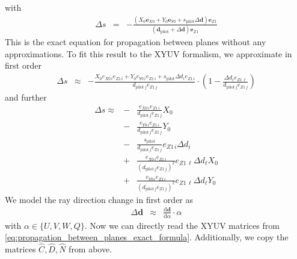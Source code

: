 \documentclass[12pt,a4paper,twoside,openright,BCOR10mm,headsepline,titlepage,abstracton,chapterprefix,final]{scrreprt}
\newcommand\Vector[1]{{\mathbf{#1}}}
\newcommand\totald{\textrm{d}}
\begin{document}
with
\begin{eqnarray}
  \Delta s &=& -\frac{ \left( X_0 \Vector{e}_{X0} + Y_0 \Vector{e}_{Y0} + s_{\text{pilot}} \Delta \Vector{d} \right) \Vector{e}_{Z1}}
                     { \left( \Vector{d}_{\text{pilot}} + \Delta \Vector{d} \right)\Vector{e}_{Z1}  }
\end{eqnarray}
This is the exact equation for propagation between planes without any approximations.
To fit this result to the XYUV formalism, we approximate in first order
\begin{eqnarray}
  \Delta s &\approx& - \frac{ X_0 e_{X0\,i}e_{Z1\,i} + Y_0 e_{Y0\,i}e_{Z1\,i} + s_{\text{pilot}} \Delta d_i e_{Z1\,i}  }
                            {d_{\text{pilot}\,j} e_{Z1\,j}}
                            \cdot
                            \left(
                            1 - \frac{ \Delta d_{\ell} e_{Z1\,\ell}}{d_{\text{pilot}\,j} e_{Z1\,j}}
                            \right)
\end{eqnarray}
and further
\begin{eqnarray}
  \Delta s \approx &-& \frac{  e_{X0\,i}e_{Z1\,i} }{d_{\text{pilot}\,j} e_{Z1\,j}} X_0 \nonumber\\
                   &-& \frac{  e_{Y0\,i}e_{Z1\,i} }{d_{\text{pilot}\,j} e_{Z1\,j}} Y_0 \nonumber\\
                   &-& \frac{ s_{\text{pilot}}   }{d_{\text{pilot}\,j} e_{Z1\,j}}e_{Z1\,i} \Delta d_i \nonumber\\
                   &+& \frac{ e_{X0\,i}e_{Z1\,i} }{ (d_{\text{pilot}\,j} e_{Z1\,j} )^2 }
                             e_{Z1\,\ell} \Delta d_{\ell} X_0  \nonumber\\
                   &+& \frac{ e_{Y0\,i}e_{Z1\,i} }{ (d_{\text{pilot}\,j} e_{Z1\,j} )^2 }
                             e_{Z1\,\ell} \Delta d_{\ell} Y_0 
\end{eqnarray}
We model the ray direction change in first order as
\begin{eqnarray}
 \Delta \Vector{d} &\approx& \frac{\totald \Vector{d}}{\totald \alpha} \cdot \alpha
\end{eqnarray}
with $\alpha \in \{ U,V,W,Q \}$. Now we can directly read the XYUV matrices from \eqref{eq:propagation_between_planes_exact_formula}.
Additionally, we copy the matrices $\hat{C},\hat{D},\hat{N}$ from above.
\end{document}

